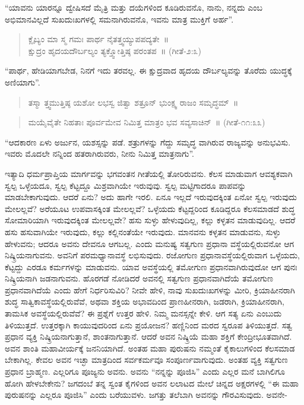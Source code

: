 “ಯಾವನು ಯಾರನ್ನೂ ದ್ವೇಷಿಸದೆ ಮೈತ್ರಿ ಮತ್ತು ದಯೆಗಳಿಂದ ಕೂಡಿರುವನೊ, ನಾನು, ನನ್ನದು ಎಂಬ ಅಭಿಮಾನವಿಲ್ಲದೆ ಸುಖದುಃಖಗಳಲ್ಲಿ ಸಮನಾಗಿರುವನೊ, ಇವನು ಮಾತ್ರ ಮುಕ್ತಿಗೆ ಅರ್ಹ”.

\begin{verse}
ಕ್ಲೈಬ್ಯಂ ಮಾ ಸ್ಮ ಗಮಃ ಪಾರ್ಥ ನೈತತ್ತ್ವಯ್ಯುಪಪದ್ಯತೇ~॥\\ಕ್ಷುದ್ರಂ ಹೃದಯದೌರ್ಬಲ್ಯಂ ತ್ಯಕ್ತ್ವೋತ್ತಿಷ್ಠ ಪರಂತಪ~॥ (ಗೀತೆ-೨:೩)
\end{verse}

“ಪಾರ್ಥ, ಹೇಡಿಯಾಗಬೇಡ, ನಿನಗೆ ಇದು ತರವಲ್ಲ. ಈ ಕ್ಷುದ್ರವಾದ ಹೃದಯ ದೌರ್ಬಲ್ಯವನ್ನು ತೊರೆದು ಯುದ್ಧಕ್ಕೆ ಅಣಿಯಾಗು”.

\begin{verse}
ತಸ್ಮಾ ತ್ತ್ವಮುತ್ತಿಷ್ಠ ಯಶೋ ಲಭಸ್ವ ಜಿತ್ವಾ ಶತ್ರೂನ್​ ಭುಂಕ್ಷ್ವ ರಾಜಂ ಸಮೃದ್ಧಮ್​~॥
\end{verse}

\begin{verse}
ಮಯೈವೈತೇ ನಿಹತಾಃ ಪೂರ್ವಮೇವ ನಿಮಿತ್ತ ಮಾತ್ರಂ ಭವ ಸವ್ಯಸಾಚಿನ್​~॥ (ಗೀತೆ-೧೧:೩೩)
\end{verse}

“ಆದಕಾರಣ ಏಳು ಅರ್ಜುನ, ಯಶಸ್ಸನ್ನು ಪಡೆ. ಶತ್ರುಗಳನ್ನು ಗೆದ್ದು ಸಮೃದ್ಧ ವಾಗಿರುವ ರಾಜ್ಯವನ್ನು ಅನುಭವಿಸು. ಇವರು ಮೊದಲೇ ನನ್ನಿಂದ ಹತರಾಗಿರುವರು, ನೀನು ನಿಮಿತ್ತ ಮಾತ್ರನಾಗು”.

ಇತ್ಯಾದಿ ಧರ್ಮಪ್ರಾಪ್ತಿಯ ಮಾರ್ಗವನ್ನು ಭಗವಂತನ ಗೀತೆಯಲ್ಲಿ ತೋರಿರುವನು. ಕೆಲಸ ಮಾಡುವಾಗ ಆವಶ್ಯಕವಾಗಿ ಸ್ವಲ್ಪ ಒಳ್ಳೆಯದೂ, ಸ್ವಲ್ಪ ಕೆಟ್ಟದ್ದೂ ಮಿಶ್ರವಾಗಿಯೇ ಇರುವುವು. ಸ್ವಲ್ಪ ಮಟ್ಟಿಗಾದರೂ ಪಾಪವನ್ನು ಮಾಡಬೇಕಾಗುವುದು. ಆದರೆ ಏನು? ಅದು ಹಾಗೇ ಇರಲಿ. ಏನೂ ಇಲ್ಲದೆ ಇರುವುದಕ್ಕಿಂತ ಏನೋ ಸ್ವಲ್ಪ ಇರುವುದು ಮೇಲಲ್ಲವೆ? ಅರೆಯೂಟ ಉಪವಾಸಕ್ಕಿಂತ ಮೇಲಲ್ಲವೆ? ಒಳ್ಳೆಯದು ಕೆಟ್ಟದ್ದರಿಂದ ಕೂಡಿದ್ದರೂ ಕೆಲಸ\-ಮಾಡದೆ ಶುದ್ಧ ಸೋಮಾರಿಯಾಗಿ ಇರುವುದಕ್ಕಿಂತ ಮೇಲಲ್ಲವೇ? ಹಸು ಸುಳ್ಳು ಹೇಳುವುದಿಲ್ಲ, ಕಲ್ಲು ಕಳ್ಳತನ ಮಾಡುವುದಿಲ್ಲ. ಆದರೆ ಹಸು ಹಸುವಾಗಿಯೇ ಇರುವುದು, ಕಲ್ಲು ಕಲ್ಲಿನಂತೆಯೇ ಇರುವುದು. ಮಾನವನು ಕಳ್ಳತನ ಮಾಡುವನು, ಸುಳ್ಳು ಹೇಳುವನು; ಆದರೂ ಅವನು ದೇವನೂ ಆಗಬಲ್ಲ. ಎಂದು ಮನುಷ್ಯ ಸತ್ವಗುಣ ಪ್ರಧಾನಾ ವಸ್ಥೆಯಲ್ಲಿರುವನೋ ಆಗ ನಿಷ್ಕ್ರಿಯನಾಗುವನು. ಅವನಿಗೆ ಪರಮಧ್ಯಾನಾವಸ್ಥೆ ಲಭಿಸುವುದು. ರಜೋಗುಣ ಪ್ರಧಾನಾವಸ್ಥೆಯಲ್ಲಿರುವಾಗ ಒಳ್ಳೆಯದು, ಕೆಟ್ಟದ್ದು ಎರಡೂ ಕರ್ಮಗಳನ್ನು ಮಾಡುವನು. ಯಾವ ಅವಸ್ಥೆಯಲ್ಲಿ ತಮೋಗುಣ ಪ್ರಧಾನವಾಗಿರುವುದೋ ಆಗ ಪುನಃ ನಿಷ್ಕ್ರಿಯನಾಗಿ ಜಡನಾಗುವನು. ಹೊರಗಡೆ ನೋಡಿದರೆ ಅವನಲ್ಲಿ ಸತ್ವಗುಣ ಪ್ರಧಾನವಾಗಿದೆಯೆ ತಮೋಗುಣ ಪ್ರಧಾನವಾಗಿದೆಯೆ ಎಂದು ಹೇಗೆ ನಿರ್ಧರಿಸುವಿರಿ? ನೀವೇ ಹೇಳಿ, ನಾವು ಸುಖದುಃಖಗಳನ್ನು ಮೀರಿ, ಕ್ರಿಯಾಹೀನರಾಗಿ ಶುದ್ಧ ಸಾತ್ವಿಕಾವಸ್ಥೆ\-ಯಲ್ಲಿರುವೆವೆ, ಅಥವಾ ಶಕ್ತಿಯ ಅಭಾವದಿಂದ ಪ್ರಾಣಹೀನರಾಗಿ, ಜಡರಾಗಿ, ಕ್ರಿಯಾಹೀನ\-ರಾಗಿ, ತಾಮಸಿಕ ಅವಸ್ಥೆಯಲ್ಲಿರುವೆವೆ? ಈ ಪ್ರಶ್ನೆಗೆ ಉತ್ತರ ಹೇಳಿ. ನಿಮ್ಮ ಮನಸ್ಸನ್ನೇ ಕೇಳಿ. ಆಗ ಸತ್ಯ ಏನು ಎಂಬುದು ತಿಳಿಯುತ್ತದೆ. ಉತ್ತರಕ್ಕಾಗಿ ಕಾಯುವುದರಿಂದ ಏನು ಪ್ರಯೋಜನ? ಹಣ್ಣಿನಿಂದ ಮರದ ಸ್ವರೂಪ ತಿಳಿಯುತ್ತದೆ. ಸತ್ವ ಪ್ರಧಾನ ವ್ಯಕ್ತಿ ನಿಷ್ಕ್ರಿಯನಾಗುತ್ತಾನೆ, ಶಾಂತನಾಗುತ್ತಾನೆ. ಆದರೆ ಅವನ ನಿಷ್ಕ್ರಿಯೆ ಮಹಾ ಶಕ್ತಿಗೆ ಕೇಂದ್ರೀ\-ಭೂತವಾಗಿದೆ. ಅವನ ಶಾಂತಿ ಮಹಾವೀರ್ಯಕ್ಕೆ ಜನನಿಯಾಗಿದೆ. ಅಂತಹ ಮಹಾ ಪುರುಷನು ನಮ್ಮಂತೆ ಕೈಕಾಲುಗಳಿಂದ ಕೆಲಸಮಾಡ ಬೇಕಾಗಿಲ್ಲ. ಕೇವಲ ಅವನ ಇಚ್ಛಾ ಮಾತ್ರದಿಂದ ಸರ್ವಕರ್ಮವೂ ಸಂಪೂರ್ಣವಾಗುವುದು. ಅಂತಹ ವ್ಯಕ್ತಿ ಸತ್ವಗುಣ ಪ್ರಧಾನ ಬ್ರಾಹ್ಮಣ. ಎಲ್ಲರಿಗೂ ಪೂಜ್ಯನು ಅವನು. ಅವನು “ನನ್ನನ್ನು ಪೂಜಿಸಿ” ಎಂದು ಎಲ್ಲರ ಮನೆ ಬಾಗಿಲಿಗೂ ಹೋಗಿ ಹೇಳಬೇಕೇನು? ಜಗದಂಬೆ ತನ್ನ ಸ್ವಂತ ಕೈಗಳಿಂದ ಅವನ ಲಲಾಟದ ಮೇಲೆ ಚಿನ್ನದ ಅಕ್ಷರಗಳಲ್ಲಿ “ಈ ಮಹಾ ಪುರುಷನನ್ನು ಎಲ್ಲರೂ ಪೂಜಿಸಿ” ಎಂದು ಬರೆಯುವಳು. ಜಗತ್ತು ತಲೆಬಾಗಿ ಅವನನ್ನು ಗೌರವಿಸುವುದು. ಅವನೇ-

